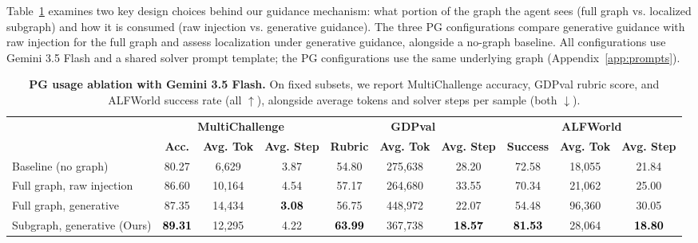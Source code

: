 Table~\ref{tab:ablation_graph_configs} examines two key design choices behind our guidance mechanism: what portion of the graph the agent sees (full graph vs. localized subgraph) and how it is consumed (raw injection vs. generative guidance). The three PG configurations compare generative guidance with raw injection for the full graph and assess localization under generative guidance, alongside a no-graph baseline. All configurations use Gemini 3.5 Flash and a shared solver prompt template; the PG configurations use the same underlying graph (Appendix~\ref{app:prompts}).

\begin{table}[htbp]
\centering
\scriptsize
\setlength{\aboverulesep}{0pt}
\setlength{\belowrulesep}{0pt}
\renewcommand{\arraystretch}{1}
\setlength{\tabcolsep}{4.7pt}
\caption{\textbf{PG usage ablation with Gemini 3.5 Flash.} On fixed subsets, we report MultiChallenge accuracy, GDPval rubric score, and ALFWorld success rate (all $\uparrow$), alongside average tokens and solver steps per sample (both $\downarrow$).}
\label{tab:ablation_graph_configs}
\begin{tabular}{l ccc ccc ccc}
\toprule
\rowcolor{GoogleYellow!15}
 & \multicolumn{3}{c}{\textbf{MultiChallenge}} & \multicolumn{3}{c}{\textbf{GDPval}} & \multicolumn{3}{c}{\textbf{ALFWorld}} \\
\arrayrulecolor{white}\cmidrule(lr){2-4}\cmidrule(lr){5-7}\cmidrule(lr){8-10}\arrayrulecolor{black}
\rowcolor{GoogleYellow!15}
\multirow{-2}{*}{\textbf{Graph Configuration}} & \textbf{Acc.} & \textbf{Avg. Tok} & \textbf{Avg. Step} & \textbf{Rubric} & \textbf{Avg. Tok} & \textbf{Avg. Step} & \textbf{Success} & \textbf{Avg. Tok} & \textbf{Avg. Step} \\
\midrule
Baseline (no graph)            & 80.27 & 6{,}629 & 3.87 & 54.80 & 275{,}638 & 28.20 & 72.58 & 18{,}055 & 21.84 \\
Full graph, raw injection      & 86.60 & 10{,}164 & 4.54 & 57.17 & 264{,}680 & 33.55 & 70.34 & 21{,}062 & 25.00 \\
Full graph, generative         & 87.35 & 14{,}434 & \cellcolor{GoogleYellow}\textcolor{black}{\textbf{3.08}} & 56.75 & 448{,}972 & 22.07 & 54.48 & 96{,}360 & 30.05 \\
Subgraph, generative (Ours)    & \cellcolor{GoogleYellow}\textcolor{black}{\textbf{89.31}} & 12{,}295 & 4.22 & \cellcolor{GoogleYellow}\textcolor{black}{\textbf{63.99}} & 367{,}738 & \cellcolor{GoogleYellow}\textcolor{black}{\textbf{18.57}} & \cellcolor{GoogleYellow}\textcolor{black}{\textbf{81.53}} & 28{,}064 & \cellcolor{GoogleYellow}\textcolor{black}{\textbf{18.80}} \\
\bottomrule
\end{tabular}
\end{table}

